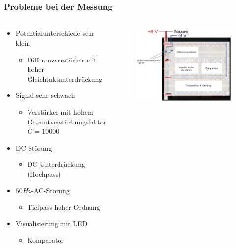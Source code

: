 \begin{frame}
    \frametitle{Probleme bei der Messung}
    \framesubtitle{}
    \begin{columns}[c]
    \begin{block}{}
        \begin{itemize}
            \item Potentialunterschiede sehr klein
            \begin{itemize}
                \item Differenzverstärker mit hoher
                Gleichtaktunterdrückung
            \end{itemize}
            \item Signal sehr schwach
                \begin{itemize}
                    \item Verstärker mit hohem Gesamtverstärkungsfaktor $G=10000$
                \end{itemize}
            \item DC-Störung
                \begin{itemize}
                    \item DC-Unterdrückung (Hochpass)
                \end{itemize}
            \item $50Hz$-AC-Störung
                \begin{itemize}
                    \item Tiefpass hoher Ordnung
                \end{itemize}
            \item Visualisierung mit LED
            \pause
                \begin{itemize}
                    \item Komparator
                \end{itemize}        
        \end{itemize}
    \end{block}
    \begin{figure}[H]
    \begin{center}
            \includegraphics[scale=0.22]{./img/schaltung/gesamt_4.png}

\end{center}
\end{figure}
\end{columns}
\end{frame}
